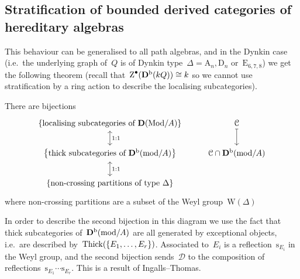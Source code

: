 \documentclass[10pt,a4paper]{article}
\begin{document}
\subsection{Stratification of bounded derived categories of hereditary algebras}

This behaviour can be generalised to all path algebras, and in the Dynkin case (i.e.\ the underlying graph of~$Q$ is of Dynkin type~$\Delta=\mathrm{A}_n,\mathrm{D}_n$ or~$\mathrm{E}_{6,7,8}$) we get the following theorem (recall that~$\operatorname{Z}^\bullet(\mathbf{D}^{\mathrm{b}}(kQ))\cong k$ so we cannot use stratification by a ring action to describe the localising subcategories).
\begin{theorem}
  There are bijections
  \begin{equation}
    \begin{tikzcd}
      \left\{ \text{localising subcategories of $\derived(\Mod/A)$} \right\} \arrow[leftrightarrow]{d}{1:1} & \mathcal{C} \arrow[mapsto]{d} \\
      \left\{ \text{thick subcategories of $\derived^\bounded(\mathrm{mod}/A)$} \right\} \arrow[leftrightarrow]{d}{1:1} & \mathcal{C}\cap\derived^\bounded(\mathrm{mod}/A) \\
      \left\{ \text{non-crossing partitions of type~$\Delta$} \right\}
    \end{tikzcd}
  \end{equation}
  where non-crossing partitions are a subset of the Weyl group~$\mathrm{W}(\Delta)$
\end{theorem}

In order to describe the second bijection in this diagram we use the fact that thick subcategories of~$\mathbf{D}^{\mathrm{b}}(\mathrm{mod}/A)$ are all generated by exceptional objects, i.e.\ are described by~$\operatorname{Thick}(\{E_1,\dotsc,E_r\})$. Associated to~$E_i$ is a reflection~$\mathrm{s}_{E_i}$ in the Weyl group, and the second bijection sends~$\mathcal{D}$ to the composition of reflections~$\mathrm{s}_{E_1}\dotsm\mathrm{s}_{E_r}$. This is a result of Ingalls--Thomas.
\end{document}
